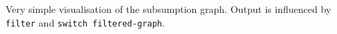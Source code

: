 
Very simple visualisation of the subsumption graph. Output is influenced
by {\tt filter} and {\tt switch filtered-graph}.

